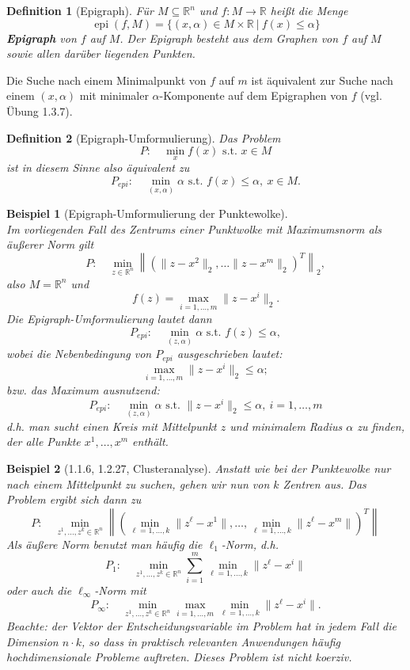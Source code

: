 \documentclass[12pt]{extreport} %
\newcommand{\R}{\mathbb{R}}
\theoremstyle{named}
\theoremstyle{nnamed}
\theoremstyle{itshape}
\newtheorem*{definition}{Definition}
\theoremstyle{normal}
\newtheorem*{beispiel}{Beispiel}
\begin{document}
\begin{definition}[Epigraph]
	Für $M \subseteq \R^n$ und $f \colon M \rightarrow \R$ heißt die Menge
	$$ \operatorname{epi}(f, M) = \big\{ (x, \alpha) \in M \times \R ~|~ f(x) \leq \alpha \big\} $$
	\textbf{Epigraph} von $f$ auf $M$. Der Epigraph besteht aus dem Graphen von $f$ auf $M$ sowie allen darüber liegenden Punkten.
\end{definition}

Die Suche nach einem Minimalpunkt von $f$ auf $m$ ist äquivalent zur Suche nach einem $(x, \alpha)$ mit minimaler $\alpha$-Komponente auf dem Epigraphen von $f$ (vgl. Übung 1.3.7). %

\begin{definition}[Epigraph-Umformulierung]
	Das Problem 
		$$ P: \quad \min_x f(x) \text{ s.t. } x \in M $$
	ist in diesem Sinne also äquivalent zu
		$$ P_{epi}: \quad \min_{(x, \alpha)} \alpha \text{ s.t. } f(x) \leq \alpha, ~x \in M. $$
\end{definition}

\begin{beispiel}[Epigraph-Umformulierung der Punktewolke] ~\\
	Im vorliegenden Fall des Zentrums einer Punktwolke mit Maximumsnorm als äußerer Norm gilt
		$$ P: \quad \min_{z \in \R^n} \left\| \left( \| z - x^2 \|_2, \dotsc \| z - x^m \|_2 \right)^T \right\|_2, $$
	also $M = \R^n$ und 
		$$ f(z) = \max_{i=1, \dotsc, m} \| z - x^i \|_2. $$
	Die Epigraph-Umformulierung lautet dann
		$$ P_{epi}: \quad \min_{(z, \alpha)} \alpha \text{ s.t. } f(z) \leq \alpha, $$
	wobei die Nebenbedingung von $P_{epi}$ ausgeschrieben lautet:
	$$ \max_{i=1, \dotsc, m} \| z - x^i \|_2 \leq \alpha; $$
	bzw. das Maximum ausnutzend:
	$$ P_{epi}: \quad \min_{(z, \alpha)} \alpha \text{ s.t. } \| z - x^i \|_2 \leq \alpha, ~ i = 1, \dotsc, m $$
	d.h. man sucht einen Kreis mit Mittelpunkt $z$ und minimalem Radius $\alpha$ zu finden, der alle Punkte $x^1, \dotsc, x^m$ enthält.
\end{beispiel}

\begin{beispiel}[1.1.6, 1.2.27, Clusteranalyse]
	Anstatt wie bei der Punktewolke nur nach einem Mittelpunkt zu suchen, gehen wir nun von $k$ Zentren aus. Das Problem ergibt sich dann zu
	$$ P: \quad \min_{z^1, \dotsc, z^k \in \R^n} \left\| \left( \min_{\ell = 1, \dotsc, k} \| z^{\ell} - x^1 \|, \dotsc, \min_{\ell = 1, \dotsc, k} \| z^\ell - x^m \| \right)^T \right\| $$ 
	Als äußere Norm benutzt man häufig die $\ell_1$-Norm, d.h.
	$$ P_1: \quad \min_{z^1, \dotsc, z^k \in \R^n} \sum_{i=1}^{m} \min_{\ell = 1, \dotsc, k} \| z^\ell - x^i \| $$
	oder auch die $\ell_\infty$-Norm mit
	$$ P_\infty: \quad \min_{z^1, \dotsc, z^k \in \R^n} \max_{i=1, \dotsc, m} \min_{\ell = 1, \dotsc, k} \| z^\ell - x^i \|. $$	
	Beachte: der Vektor der Entscheidungsvariable im Problem hat in jedem Fall die Dimension $n \cdot k$, so dass in praktisch relevanten Anwendungen häufig hochdimensionale Probleme auftreten. Dieses Problem ist nicht koerziv.
\end{beispiel}
\end{document}
